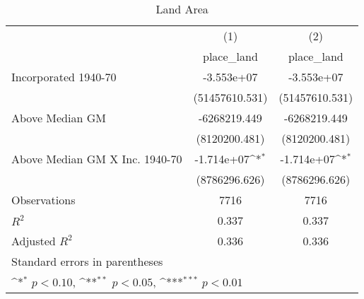 \begin{table}[htbp]\centering
\def\sym#1{\ifmmode^{#1}\else\(^{#1}\)\fi}
\caption{Land Area}
\begin{tabular}{l*{2}{c}}
\hline\hline
                    &\multicolumn{1}{c}{(1)}&\multicolumn{1}{c}{(2)}\\
                    &\multicolumn{1}{c}{place\_land}&\multicolumn{1}{c}{place\_land}\\
\hline
Incorporated 1940-70&  -3.553e+07         &  -3.553e+07         \\
                    &(51457610.531)         &(51457610.531)         \\
[1em]
Above Median GM     &-6268219.449         &-6268219.449         \\
                    &(8120200.481)         &(8120200.481)         \\
[1em]
Above Median GM X Inc. 1940-70&  -1.714e+07\sym{*}  &  -1.714e+07\sym{*}  \\
                    &(8786296.626)         &(8786296.626)         \\
\hline
Observations        &        7716         &        7716         \\
\(R^{2}\)           &       0.337         &       0.337         \\
Adjusted \(R^{2}\)  &       0.336         &       0.336         \\
\hline\hline
\multicolumn{3}{l}{\footnotesize Standard errors in parentheses}\\
\multicolumn{3}{l}{\footnotesize \sym{*} \(p<0.10\), \sym{**} \(p<0.05\), \sym{***} \(p<0.01\)}\\
\end{tabular}
\end{table}

